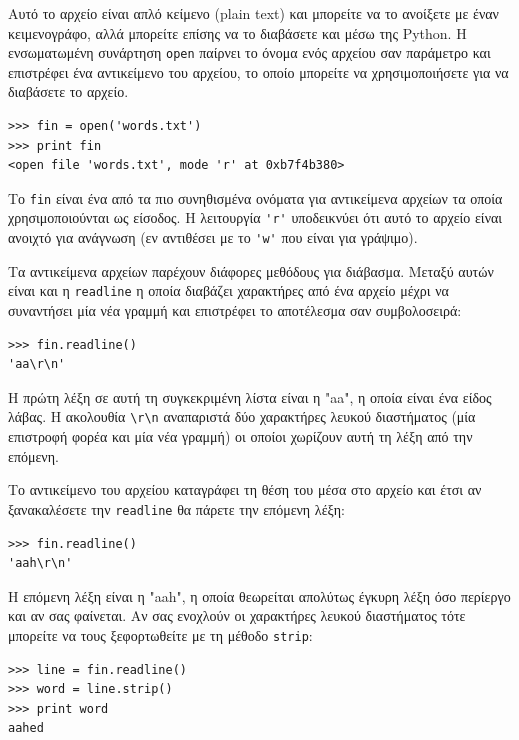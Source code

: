 \documentclass[10pt]{book}
\begin{document}
Αυτό το αρχείο είναι απλό κείμενο (plain text) και μπορείτε να το ανοίξετε με έναν κειμενογράφο, αλλά μπορείτε επίσης να το διαβάσετε και μέσω της Python.  Η ενσωματωμένη συνάρτηση {\tt open} παίρνει το όνομα ενός αρχείου σαν παράμετρο και επιστρέφει ένα αντικείμενο του αρχείου, το οποίο μπορείτε να χρησιμοποιήσετε για να διαβάσετε το αρχείο. 

\begin{verbatim}
>>> fin = open('words.txt')
>>> print fin
<open file 'words.txt', mode 'r' at 0xb7f4b380>
\end{verbatim}
%

Το {\tt fin} είναι ένα από τα πιο συνηθισμένα ονόματα για αντικείμενα αρχείων τα οποία χρησιμοποιούνται ως είσοδος. Η λειτουργία \verb"'r'" υποδεικνύει ότι αυτό το αρχείο είναι ανοιχτό για ανάγνωση (εν αντιθέσει με το \verb"'w'" που είναι για γράψιμο).


Τα αντικείμενα αρχείων παρέχουν διάφορες μεθόδους για διάβασμα. Μεταξύ αυτών είναι και η {\tt readline} η οποία διαβάζει χαρακτήρες από ένα αρχείο μέχρι να συναντήσει μία νέα γραμμή και επιστρέφει το αποτέλεσμα σαν συμβολοσειρά:

\begin{verbatim}
>>> fin.readline()
'aa\r\n'
\end{verbatim}
%

Η πρώτη λέξη σε αυτή τη συγκεκριμένη λίστα είναι η "aa", η οποία είναι ένα είδος λάβας. Η ακολουθία \verb"\r\n" αναπαριστά δύο χαρακτήρες λευκού διαστήματος (μία επιστροφή φορέα και μία νέα γραμμή) οι οποίοι χωρίζουν αυτή τη λέξη από την επόμενη.

Το αντικείμενο του αρχείου καταγράφει τη θέση του μέσα στο αρχείο και έτσι αν ξανακαλέσετε την {\tt readline} θα πάρετε την επόμενη λέξη:

\begin{verbatim}
>>> fin.readline()
'aah\r\n'
\end{verbatim}
%

Η επόμενη λέξη είναι η "aah", η οποία θεωρείται απολύτως έγκυρη λέξη όσο περίεργο και αν σας φαίνεται. Αν σας ενοχλούν οι χαρακτήρες λευκού  διαστήματος τότε μπορείτε να τους ξεφορτωθείτε με τη μέθοδο {\tt strip}:

\begin{verbatim}
>>> line = fin.readline()
>>> word = line.strip()
>>> print word
aahed
\end{verbatim}
%
\end{document}
